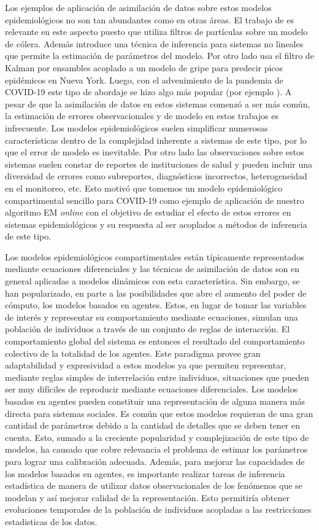 Los ejemplos de aplicación de asimilación de datos sobre estos modelos epidemiológicos no son tan abundantes como en otras áreas. El trabajo de \cite{Ionides2006} es relevante en este aspecto puesto que utiliza filtros de partículas sobre un modelo de cólera. Además introduce una técnica de inferencia para sistemas no lineales que permite la estimación de parámetros del modelo. Por otro lado \cite{Shaman2012} usa el filtro de Kalman por ensambles acoplado a un modelo de gripe para predecir picos epidémicos en Nueva York. Luego, con el advenimiento de la pandemia de COVID-19 este tipo de abordaje se hizo algo más popular (por ejemplo \cite{Evensen2020, Li2020}). A pesar de que la asimilación de datos en estos sistemas comenzó a ser más común, la estimación de errores observacionales y de modelo en estos trabajos es infrecuente. Los modelos epidemiológicos suelen simplificar numerosas características dentro de la complejidad inherente a sistemas de este tipo, por lo que el error de modelo es inevitable. Por otro lado las observaciones sobre estos sistemas suelen constar de reportes de instituciones de salud y pueden incluir una diversidad de errores como subreportes, diagnósticos incorrectos, heterogeneidad en el monitoreo, etc. Esto motivó que tomemos un modelo epidemiológico compartimental sencillo para COVID-19 como ejemplo de aplicación de nuestro algoritmo EM \textit{online} con el objetivo de estudiar el efecto de estos errores en sistemas epidemiológicos y su respuesta al ser acoplados a métodos de inferencia de este tipo.

Los modelos epidemiológicos compartimentales están típicamente representados mediante ecuaciones diferenciales y las técnicas de asimilación de datos son en general aplicadas a modelos dinámicos con esta característica. Sin embargo, se han popularizado, en parte a las posibilidades que abre el aumento del poder de cómputo, los modelos basados en agentes. Estos, en lugar de tomar las variables de interés y representar su comportamiento mediante ecuaciones, simulan una población de individuos a través de un conjunto de reglas de interacción. El comportamiento global del sistema es entonces el resultado del comportamiento colectivo de la totalidad de los agentes. Este paradigma provee gran adaptabilidad y expresividad a estos modelos ya que permiten representar, mediante reglas simples de interrelación entre individuos, situaciones que pueden ser muy difíciles de reproducir mediante ecuaciones diferenciales. Los modelos basados en agentes pueden constituir una representación de alguna manera más directa para sistemas sociales. Es común que estos modelos requieran de una gran cantidad de parámetros debido a la cantidad de detalles que se deben tener en cuenta. Esto, sumado a la creciente popularidad y complejización de este tipo de modelos, ha causado que cobre relevancia el problema de estimar los parámetros para lograr una calibración adecuada. Además, para mejorar las capacidades de los modelos basados en agentes, es importante realizar tareas de inferencia estadística de manera de utilizar datos observacionales de los fenómenos que se modelan y así mejorar calidad de la representación. Esto permitiría obtener evoluciones temporales de la población de individuos acopladas a las restricciones estadisticas de los datos.

